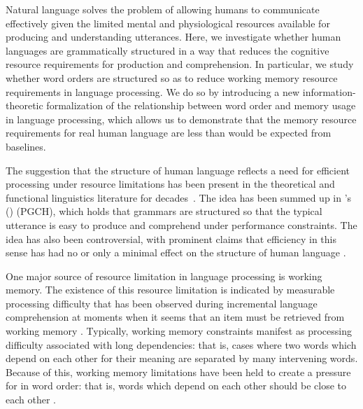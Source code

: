 

Natural language solves the problem of allowing humans to communicate effectively given the limited mental and physiological resources available for producing and understanding utterances. Here, we investigate whether human languages are grammatically structured in a way that reduces the cognitive resource requirements for production and comprehension. In particular, we study whether word orders are structured so as to reduce working memory resource requirements in language processing. We do so by introducing a new information-theoretic formalization of the relationship between word order and memory usage in language processing, which allows us to demonstrate that the memory resource requirements for real human language are less than would be expected from baselines.

The suggestion that the structure of human language reflects a need for efficient processing under resource limitations has been present in the theoretical and functional linguistics literature for decades~\citep{yngve1961,berwick1984grammatical,hawkins1994performance,jaeger2011language,gibson2019efficiency}. The idea has been summed up in \citeauthor{hawkins1994efficiency}'s (\citeyear{hawkins1994efficiency})  (PGCH), which holds that grammars are structured so that the typical utterance is easy to produce and comprehend under performance constraints.
The idea has also been controversial, with prominent claims that efficiency in this sense has had no or only a minimal effect on the structure of human language \citep{chomsky2005three}.

One major source of resource limitation in language processing is working memory. The existence of this resource limitation is indicated by measurable processing difficulty that has been observed during incremental language comprehension at moments when it seems that an item must be retrieved from working memory \citep{gibson1998syntactic,gibson1999memory,gibson2000dependency,mcelree,lewis2005activationbased,bartek2011search,nicenboim2015working}. Typically, working memory constraints manifest as processing difficulty associated with long dependencies: that is, cases where two words which depend on each other for their meaning are separated by many intervening words. Because of this, working memory limitations have been held to create a pressure for  in word order: that is, words which depend on each other should be close to each other \citep[for recent reviews of this idea, see][]{liu-dependency-2017,temperley-minimizing-2018}.

